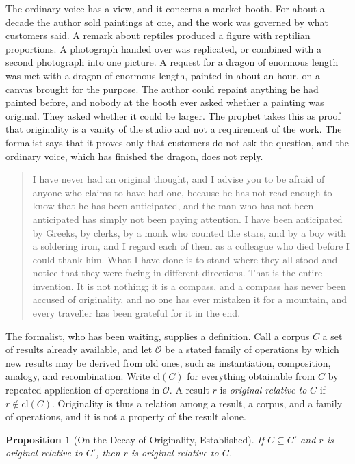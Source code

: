 \documentclass[11pt,openany,twoside]{book}
\theoremstyle{plain}
\newtheorem{proposition}{Proposition}[chapter]
\theoremstyle{definition}
\theoremstyle{remark}
\begin{document}
The ordinary voice has a view, and it concerns a market booth. For about a decade the author sold paintings at one, and the work was governed by what customers said. A remark about reptiles produced a figure with reptilian proportions. A photograph handed over was replicated, or combined with a second photograph into one picture. A request for a dragon of enormous length was met with a dragon of enormous length, painted in about an hour, on a canvas brought for the purpose. The author could repaint anything he had painted before, and nobody at the booth ever asked whether a painting was original. They asked whether it could be larger. The prophet takes this as proof that originality is a vanity of the studio and not a requirement of the work. The formalist says that it proves only that customers do not ask the question, and the ordinary voice, which has finished the dragon, does not reply.

\begin{quotation}\noindent I have never had an original thought, and I advise you to be afraid of anyone who claims to have had one, because he has not read enough to know that he has been anticipated, and the man who has not been anticipated has simply not been paying attention. I have been anticipated by Greeks, by clerks, by a monk who counted the stars, and by a boy with a soldering iron, and I regard each of them as a colleague who died before I could thank him. What I have done is to stand where they all stood and notice that they were facing in different directions. That is the entire invention. It is not nothing; it is a compass, and a compass has never been accused of originality, and no one has ever mistaken it for a mountain, and every traveller has been grateful for it in the end.
\end{quotation}

The formalist, who has been waiting, supplies a definition. Call a corpus $C$ a set of results already available, and let $\mathcal O$ be a stated family of operations by which new results may be derived from old ones, such as instantiation, composition, analogy, and recombination. Write $\mathrm{cl}(C)$ for everything obtainable from $C$ by repeated application of operations in $\mathcal O$. A result $r$ is \emph{original relative to} $C$ if $r\notin\mathrm{cl}(C)$. Originality is thus a relation among a result, a corpus, and a family of operations, and it is not a property of the result alone.

\begin{proposition}[On the Decay of Originality, Established]\label{prop:originality}
If $C\subseteq C'$ and $r$ is original relative to $C'$, then $r$ is original relative to $C$.
\end{proposition}
\end{document}

